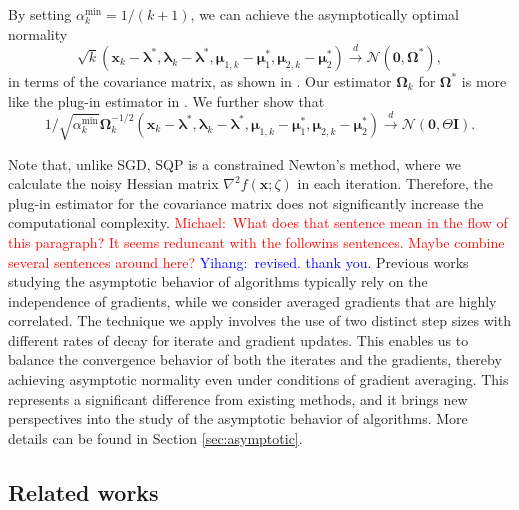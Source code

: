 \documentclass[aos]{imsart}
\numberwithin{equation}{section}
\theoremstyle{plain}
\newcommand{\michael}[1]{\textcolor{red}{Michael:\ #1}}
\newcommand{\yihang}[1]{\textcolor{blue}{Yihang:\ #1}}
\begin{document}
By setting $\alpha_k^{\text{min}} = 1 / (k+1)$, we can achieve the asymptotically optimal normality 
$$\sqrt{k}  (\bm{x}_k - \bm{\lambda}^{*}, \bm{\lambda}_{k} - \bm{\lambda}^{*}, \bm{\mu}_{1,k} - \bm{\mu}_1^{*}, \bm{\mu}_{2,k} - \bm{\mu}_2^{*}) \stackrel{d}{\longrightarrow} \mathcal{N} \left( \bm{0}, \bm{\Omega}^{*} \right) ,$$ 
in terms of the covariance matrix, as shown in \cite{duchi2021asymptotic}. 
Our estimator  $\bm{\Omega}_k$ for $\bm{\Omega}^{*}$ is more like the plug-in estimator in \cite{chen2020statistical}. 
We further show that 
$$ 1/\sqrt{\alpha_k^{\text{min}}} \bm{\Omega}_k^{-1/2}(\bm{x}_k - \bm{\lambda}^{*}, \bm{\lambda}_{k} - \bm{\lambda}^{*}, \bm{\mu}_{1,k} - \bm{\mu}_1^{*}, \bm{\mu}_{2,k} - \bm{\mu}_2^{*}) \stackrel{d}{\longrightarrow} \mathcal{N} \left( \bm{0}, \Theta \bm{I} \right) .$$ 

Note that, unlike SGD, SQP is a constrained Newton's method, where we calculate the noisy Hessian matrix $\nabla^2 f(\bm{x};\zeta)$ in each iteration. Therefore, the plug-in estimator for the covariance matrix does not significantly increase the computational complexity. 
\michael{What does that sentence mean in the flow of this paragraph?  It seems reduncant with the followins sentences.  Maybe combine several sentences around here?}
\yihang{revised. thank you.}
Previous works studying the asymptotic behavior of algorithms typically rely on the independence of gradients, while we consider averaged gradients that are highly correlated.
The technique we apply involves the use of two distinct step sizes with different rates of decay for iterate and gradient updates. This enables us to balance the convergence behavior of both the iterates and the gradients, thereby achieving asymptotic normality even under conditions of gradient averaging.
This represents a significant difference from existing methods, and it brings new perspectives into the study of the asymptotic behavior of algorithms. More details can be found in Section \ref{sec:asymptotic}.



\subsection{Related works}
\label{intro:related_works}
\end{document}
